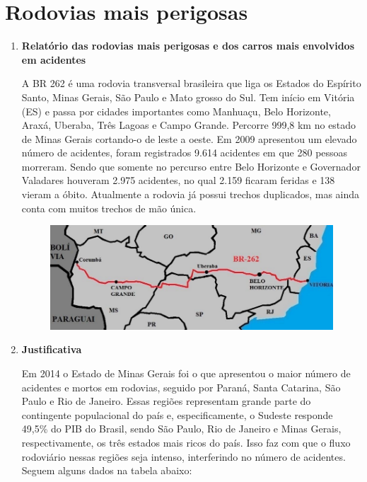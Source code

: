 \chapter[Rodovias mais perigosas]{Rodovias mais perigosas}

\begin{enumerate}

\item \textbf{Relatório das rodovias mais perigosas e dos carros mais envolvidos em acidentes}

A BR 262 é uma rodovia transversal brasileira que liga os Estados do Espírito Santo, Minas Gerais, São Paulo e Mato grosso do Sul. Tem início em Vitória (ES) e passa por cidades importantes como Manhuaçu, Belo Horizonte, Araxá, Uberaba, Três Lagoas e Campo Grande. Percorre 999,8 km no estado de Minas Gerais cortando-o de leste a oeste. Em 2009 apresentou um elevado número de acidentes, foram registrados 9.614 acidentes em que 280 pessoas morreram. Sendo que somente no percurso entre Belo Horizonte e Governador Valadares houveram 2.975 acidentes, no qual 2.159 ficaram feridas e 138 vieram a óbito. Atualmente a rodovia já possui trechos duplicados, mas ainda conta com muitos trechos de mão única.

\begin{figure}[h]
  \centering
  \includegraphics[width=400px, scale=0.5]{figuras/mapa}
  \label{table:mapa}
\end{figure}

\item \textbf{Justificativa}

Em 2014 o Estado de Minas Gerais foi o que apresentou o maior número de acidentes e mortos em rodovias, seguido por Paraná, Santa Catarina, São Paulo e Rio de Janeiro. Essas regiões representam grande parte do contingente populacional do país e, especificamente, o Sudeste responde 49,5\% do PIB do Brasil, sendo São Paulo, Rio de Janeiro e Minas Gerais, respectivamente, os três estados mais ricos do país. Isso faz com que o fluxo rodoviário nessas regiões seja intenso, interferindo no número de acidentes. Seguem alguns dados na tabela abaixo:


\end{enumerate}
